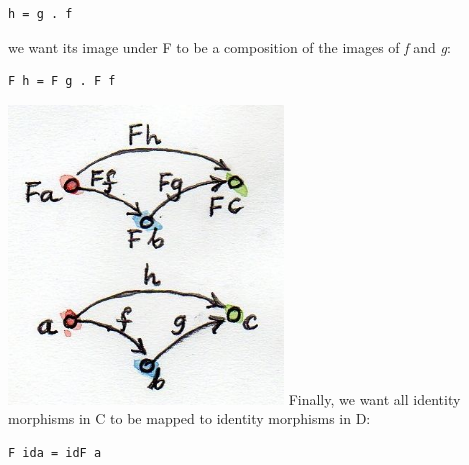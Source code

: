 \begin{verbatim}
h = g . f
\end{verbatim}

we want its image under F to be a composition of the images of \emph{f}
and \emph{g}:

\begin{verbatim}
F h = F g . F f
\end{verbatim}

\includegraphics[width=2.87500in]{images/functorcompos.jpg} Finally, we
want all identity morphisms in C to be mapped to identity morphisms in
D:

\begin{verbatim}
F ida = idF a
\end{verbatim}


